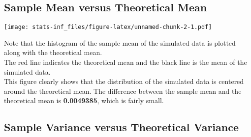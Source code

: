 \documentclass[
]{article}
\newenvironment{Shaded}{\begin{snugshade}}{\end{snugshade}}
\newcommand{\DataTypeTok}[1]{\textcolor[rgb]{0.13,0.29,0.53}{#1}}
\newcommand{\DecValTok}[1]{\textcolor[rgb]{0.00,0.00,0.81}{#1}}
\newcommand{\FloatTok}[1]{\textcolor[rgb]{0.00,0.00,0.81}{#1}}
\newcommand{\KeywordTok}[1]{\textcolor[rgb]{0.13,0.29,0.53}{\textbf{#1}}}
\newcommand{\NormalTok}[1]{#1}
\newcommand{\OperatorTok}[1]{\textcolor[rgb]{0.81,0.36,0.00}{\textbf{#1}}}
\newcommand{\StringTok}[1]{\textcolor[rgb]{0.31,0.60,0.02}{#1}}
\begin{document}
\hypertarget{sample-mean-versus-theoretical-mean}{%
\subsection{Sample Mean versus Theoretical
Mean}\label{sample-mean-versus-theoretical-mean}}

\begin{Shaded}
\end{Shaded}

\texttt{[image: stats-inf\_files/figure-latex/unnamed-chunk-2-1.pdf]}

Note that the histogram of the sample mean of the simulated data is
plotted along with the theoretical mean.\\
The red line indicates the theoretical mean and the black line is the
mean of the simulated data.\\
This figure clearly shows that the distribution of the simulated data is
centered around the theoretical mean. The difference between the sample
mean and the theoretical mean is \textbf{0.0049385}, which is fairly
small.

\hypertarget{sample-variance-versus-theoretical-variance}{%
\subsection{Sample Variance versus Theoretical
Variance}\label{sample-variance-versus-theoretical-variance}}
\end{document}

